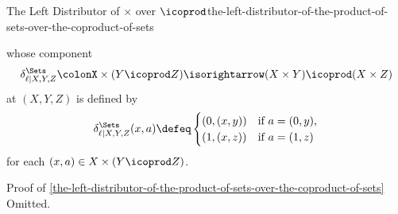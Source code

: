 \begin{definition}{The Left Distributor of $\times$ over $\icoprod$}{the-left-distributor-of-the-product-of-sets-over-the-coproduct-of-sets}
\begin{scalemath}
\begin{tikzcd}[row sep={0.0cm,between origins}, column sep={0.0cm,between origins}, background color=backgroundColor, ampersand replacement=\&]
        \end{tikzcd}
    \end{scalemath}
    whose component
    \[
        \delta^{\Sets}_{\ell|X,Y,Z}%
        \colon%
        X\times(Y\icoprod Z)%
        \isorightarrow%
        (X\times Y)\icoprod(X\times Z)%
    \]%
    at $(X,Y,Z)$ is defined by
    \[
        \delta^{\Sets}_{\ell|X,Y,Z}(x,a)%
        \defeq%
        \begin{cases}
            (0,(x,y)) &\text{if $a=(0,y)$,}\\
            (1,(x,z)) &\text{if $a=(1,z)$}\
        \end{cases}
    \]%
    for each $(x,a)\in X\times(Y\icoprod Z)$.
\end{definition}
\begin{Proof}{Proof of \cref{the-left-distributor-of-the-product-of-sets-over-the-coproduct-of-sets}}%
    Omitted.
\end{Proof}
